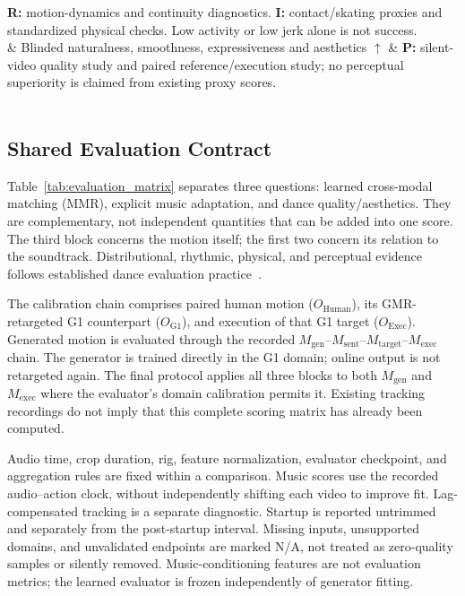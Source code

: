 \begin{table}[!t]
\begin{tabular}
\textbf{R:} motion-dynamics and continuity diagnostics. \textbf{I:} contact/skating
proxies and standardized physical checks. Low activity or low jerk alone is not success. \\
& Blinded naturalness, smoothness, expressiveness and aesthetics $\uparrow$ &
\textbf{P:} silent-video quality study and paired reference/execution study;
no perceptual superiority is claimed from existing proxy scores. \\
\bottomrule
{} \\
\end{tabular}
\end{table}

\subsection{Shared Evaluation Contract}
Table~\ref{tab:evaluation_matrix} separates three questions: learned cross-modal
matching (MMR), explicit music adaptation, and dance quality/aesthetics. They are
complementary, not independent quantities that can be added into one score.
The third block concerns the motion itself; the first two concern its relation
to the soundtrack. Distributional, rhythmic, physical, and perceptual evidence
follows established dance evaluation practice~\cite{li2021aist,tseng2023edge,li2024lodge,ji2026discoforcing,li2026roboperform}.

The calibration chain comprises paired human motion ($O_{\mathrm{Human}}$), its
GMR-retargeted G1 counterpart ($O_{\mathrm{G1}}$), and execution of that G1 target
($O_{\mathrm{Exec}}$). Generated motion is evaluated through the recorded
$M_{\mathrm{gen}}$--$M_{\mathrm{sent}}$--$M_{\mathrm{target}}$--$M_{\mathrm{exec}}$
chain. The generator is trained directly in the G1 domain; online output is not
retargeted again. The final protocol applies all three blocks to both
$M_{\mathrm{gen}}$ and $M_{\mathrm{exec}}$ where the evaluator's domain calibration
permits it. Existing tracking recordings do not imply that this complete scoring
matrix has already been computed.

Audio time, crop duration, rig, feature normalization, evaluator checkpoint, and
aggregation rules are fixed within a comparison. Music scores use the recorded
audio--action clock, without independently shifting each video to improve fit.
Lag-compensated tracking is a separate diagnostic. Startup is reported untrimmed
and separately from the post-startup interval. Missing inputs, unsupported
domains, and unvalidated endpoints are marked N/A, not treated as zero-quality
samples or silently removed. Music-conditioning features are not evaluation
metrics; the learned evaluator is frozen independently of generator fitting.

